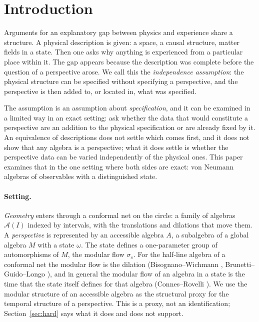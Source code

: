 \documentclass[12pt]{article}
\theoremstyle{definition}
\theoremstyle{remark}
\begin{document}
\section{Introduction}\label{sec:intro}

Arguments for an explanatory gap between physics and experience \cite{Chalmers} share a structure. A physical description is given: a space, a causal structure, matter
fields in a state. Then one asks why anything is experienced from a particular
place within it. The gap appears because the description was complete before the
question of a perspective arose. We call this the \emph{independence assumption}:
the physical structure can be specified without specifying a perspective, and the
perspective is then added to, or located in, what was specified.

The assumption is an assumption about \emph{specification}, and it can be examined in
a limited way in an exact setting: ask whether the data that would constitute a
perspective are an addition to the physical specification or are already fixed by it.
An equivalence of descriptions does not settle which comes first, and it does not show
that any algebra is a perspective; what it does settle is whether the perspective data
can be varied independently of the physical ones. This paper examines that in the one
setting where both sides are exact: von Neumann algebras of observables with a
distinguished state.

\paragraph{Setting.} \emph{Geometry} enters through a conformal net on the circle: a
family of algebras \(\mathcal A(I)\) indexed by intervals, with the translations
and dilations that move them. A \emph{perspective} is represented by an
accessible algebra \(A\), a subalgebra of a global algebra \(M\) with a
state \(\omega\). The state defines a one-parameter group of automorphisms of
\(M\), the modular flow \(\sigma_s\). For the half-line algebra of a conformal net
the modular flow is the dilation (Bisognano--Wichmann \cite{BW}, Brunetti--Guido--Longo \cite{BGL}), and in general the modular flow of an algebra in a state is the time that the state itself defines for that algebra (Connes--Rovelli \cite{CR}). We use the modular
structure of an accessible algebra as the structural proxy for the temporal
structure of a perspective. This is a proxy, not an identification; Section~\ref{sec:hard}
says what it does and does not support.
\end{document}

